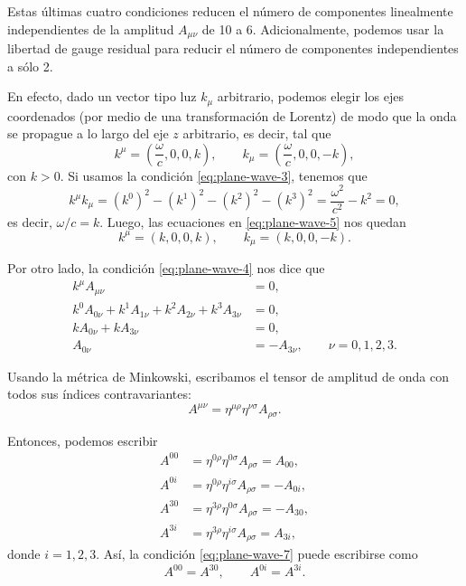 \documentclass[letterpaper,11pt]{article}
\begin{document}
Estas últimas cuatro condiciones reducen el número de componentes linealmente independientes de la amplitud $A_{\mu\nu}$ de 10 a 6. Adicionalmente, podemos usar la libertad de gauge residual para reducir el número de componentes independientes a sólo 2.

En efecto, dado un vector tipo luz $k_{\mu}$ arbitrario, podemos elegir los ejes coordenados (por medio de una transformación de Lorentz) de modo que la onda se propague a lo largo del eje $z$ arbitrario, es decir, tal que
\begin{equation}
k^{\mu} = \left( \frac{\omega}{c},0,0,k\right), \qquad k_{\mu} = \left( \frac{\omega}{c},0,0,-k\right), \label{eq:plane-wave-5}
\end{equation}
con $k > 0$. Si usamos la condición \eqref{eq:plane-wave-3}, tenemos que
\begin{equation}
k^{\mu} k_{\mu} = (k^0)^2 - (k^1)^2 - (k^2)^2 - (k^3)^2 = \frac{\omega^2}{c^2} - k^2 = 0,
\end{equation}
es decir, $\omega/c = k$. Luego, las ecuaciones en \eqref{eq:plane-wave-5} nos quedan
\begin{equation}
k^{\mu} = \left(k,0,0,k\right), \qquad k_{\mu} = \left(k,0,0,-k\right). \label{eq:plane-wave-6}
\end{equation}

Por otro lado, la condición \eqref{eq:plane-wave-4} nos dice que
\begin{align}
k^{\mu} A_{\mu\nu} &= 0, \\
k^0 A_{0\nu} + k^1 A_{1\nu} + k^2 A_{2\nu} + k^3 A_{3\nu} &= 0, \\
k  A_{0\nu} + k A_{3\nu} &= 0, \\
A_{0\nu} &= - A_{3\nu}, \qquad \nu = 0,1,2,3. \label{eq:plane-wave-7}
\end{align}

Usando la métrica de Minkowski, escribamos el tensor de amplitud de onda con todos sus índices contravariantes: 
\begin{equation}
A^{\mu\nu} = \eta^{\mu\rho} \eta^{\nu\sigma} A_{\rho\sigma}.
\end{equation}

Entonces, podemos escribir
\begin{align}
A^{00} &= \eta^{0\rho} \eta^{0\sigma} A_{\rho\sigma} = A_{00}, \\
A^{0i} &= \eta^{0\rho} \eta^{i\sigma} A_{\rho\sigma} = - A_{0i}, \\
A^{30} &= \eta^{3\rho} \eta^{0\sigma} A_{\rho\sigma} = - A_{30}, \\
A^{3i} &= \eta^{3\rho} \eta^{i\sigma} A_{\rho\sigma} = A_{3i},
\end{align}
donde $i = 1,2,3$. Así, la condición \eqref{eq:plane-wave-7} puede escribirse como
\begin{equation}
A^{00} = A^{30}, \qquad A^{0i} = A^{3i}. 
\end{equation}
\end{document}
